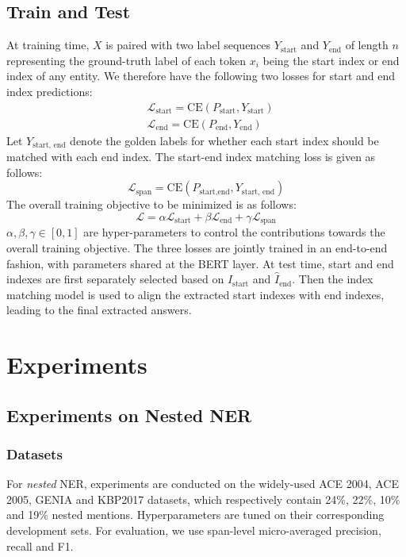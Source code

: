 \documentclass[11pt,a4paper]{article}
\begin{document}
\subsection{Train and Test}
At training time, $X$ is  paired with two 
label sequences $Y_\text{start}$ and $Y_\text{end}$ of length $n$ 
representing the ground-truth label of each token $x_i$ being the start index or end index of any entity. We therefore have the following two losses for start and end index predictions:
\begin{equation}
\begin{aligned}
    &\mathcal{L}_\text{start}=\text{CE}(P_\text{start}, Y_\text{start}) \\
    &\mathcal{L}_\text{end}=\text{CE}(P_\text{end}, Y_\text{end})
 \end{aligned}
\end{equation}
Let $Y_\text{start, end}$  denote the golden labels for whether each start index should be matched with each end index. The start-end index matching loss is given as follows:
\begin{equation}
    \mathcal{L}_\text{span}=\text{CE}(P_{\text{start},\text{end}}, Y_\text{start, end})
    \label{training-obj}
\end{equation}
The overall training objective to be minimized is as follows:
\begin{equation}
    \mathcal{L}=\alpha\mathcal{L}_\text{start}+\beta\mathcal{L}_\text{end}+\gamma\mathcal{L}_\text{span}
\end{equation}
$\alpha,\beta,\gamma\in [0,1]$ are hyper-parameters to control the contributions towards the overall training objective. The three losses are jointly trained in an end-to-end fashion, with parameters shared at the BERT layer. At test time, start and end indexes are first separately selected based on $\hat{I}_\text{start}$ and $\hat{I}_\text{end}$. Then the index matching model is used to align the extracted start indexes with end indexes, leading to the final extracted answers. 




\section{Experiments}

\subsection{Experiments on Nested NER} 
\subsubsection{Datasets} 
For {\em nested} NER, experiments are conducted on the  
widely-used  ACE 2004, ACE 2005, GENIA and KBP2017 datasets, which respectively contain  24\%, 22\%, 10\% and 19\% nested mentions. 
Hyperparameters are tuned on their corresponding development sets. 
For evaluation, we 
use span-level micro-averaged precision, recall and F1.  
\end{document}
